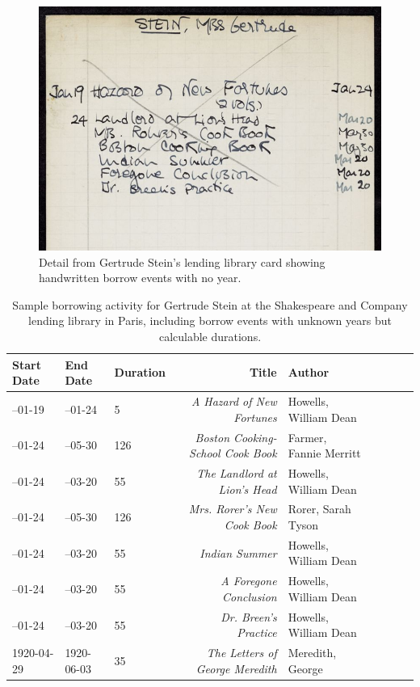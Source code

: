 \documentclass{anthology-ch}         %
\begin{document}
\begin{figure}[h]
  \centering
  \includegraphics[width=0.7\linewidth]{assets/stein_lendingcard_unknownyear.jpg}
  \caption{Detail from Gertrude Stein's lending library card showing handwritten borrow events with no year. \cite{stein_beachpapers_pul, noauthor_gertrude_nodate} }
  \label{fig:stein-lending-card}
\end{figure}


\begin{table}[h]
  \centering 
  \begin{tabular}{lllrllrrl}
    \toprule
    Start Date & End Date & Duration & Title & Author \\ 
    \midrule
--01-19 & --01-24 & 5 & \textit{A Hazard of New Fortunes} & Howells, William Dean \\
--01-24 & --05-30 & 126 & \textit{Boston Cooking-School Cook Book} & Farmer, Fannie Merritt \\
--01-24 & --03-20 & 55 & \textit{The Landlord at Lion's Head} & Howells, William Dean \\
--01-24 & --05-30 & 126 & \textit{Mrs. Rorer's New Cook Book} & Rorer, Sarah Tyson \\
--01-24 & --03-20 & 55 & \textit{Indian Summer} & Howells, William Dean \\
--01-24 & --03-20 & 55 & \textit{A Foregone Conclusion} & Howells, William Dean \\
--01-24 & --03-20 & 55 & \textit{Dr. Breen's Practice} & Howells, William Dean \\
1920-04-29 & 1920-06-03 & 35 & \textit{The Letters of George Meredith} & Meredith, George \\
    \bottomrule
  \end{tabular}
  \caption{Sample borrowing activity for Gertrude Stein at the Shakespeare and Company lending library in Paris, including borrow events with unknown years but calculable durations.}
  \label{tab:stein-borrowing}
\end{table}
\end{document}

